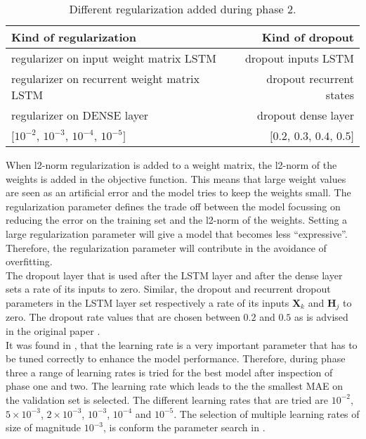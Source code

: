 \begin{table}[ht]
	\centering
	\begin{tabular}{@{}l|r@{}} \toprule
		\textbf{Kind of regularization} & 	\textbf{Kind of dropout}\\\midrule
		regularizer on input weight matrix LSTM 	& dropout inputs LSTM\\\hline
		regularizer on recurrent weight matrix LSTM & dropout recurrent states\\\hline
		regularizer on DENSE layer & dropout dense layer\\\hline
		$[ 10^{-2} $, $ 10^{-3} $, $ 10^{-4}$, $ 10^{-5} ]$ & $[ 0.2 $, $ 0.3 $, $ 0.4$, $ 0.5 ]$\\\bottomrule
\end{tabular}
\caption{Different regularization added during phase 2.}
\label{tab:regulation}
\end{table}

When l2-norm regularization is added to a weight matrix, the l2-norm of the weights is added in the objective function. This means that large weight values are seen as an artificial error and the model tries to keep the weights small. The regularization parameter defines the trade off between the model focussing on reducing the error on the training set and the l2-norm of the weights. Setting a large regularization parameter will give a model that becomes less ``expressive''. Therefore, the regularization parameter will contribute in the avoidance of overfitting.\\ 
The dropout layer that is used after the LSTM layer and after the dense layer sets a rate of its inputs to zero. Similar, the dropout and recurrent dropout parameters in the LSTM layer set respectively a rate of its inputs $ \bm{X}_{k} $ and $ \bm{H}_{j} $ to zero. The dropout rate values that are chosen between $ 0.2 $ and $ 0.5 $ as is advised in the original paper \cite{Mele1993}.\\

It was found in \cite{Greff2017}, that the learning rate is a very important parameter that has to be tuned correctly to enhance the model performance. Therefore, during phase three a range of learning rates is tried for the best model after inspection of phase one and two. The learning rate which leads to the the smallest MAE on the validation set is selected. The different learning rates that are tried are $ 10^{-2} $, $ 5\times10^{-3} $, $ 2\times10^{-3} $, $ 10^{-3} $, $ 10^{-4} $ and $ 10^{-5} $. The selection of multiple learning rates of size of magnitude $ 10^{-3} $, is conform the parameter search in \cite{Shi2018}.\\

